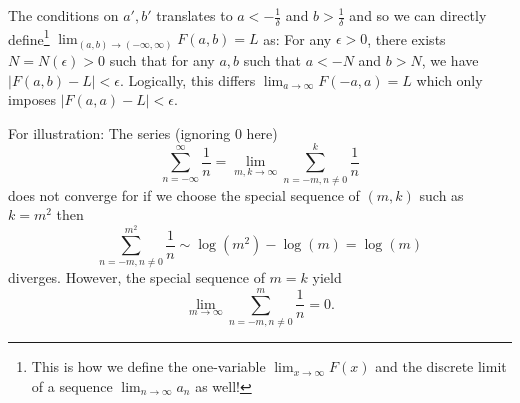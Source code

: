 \documentclass[12pt]{article}
\begin{document}
The conditions on $a', b'$ translates to $a < -\frac{1}{\delta}$ and $b > \frac{1}{\delta}$ and so we can directly define\footnote{This is how we define the one-variable $\lim_{x \rightarrow \infty} F(x)$ and the discrete limit of a sequence $\lim_{n \rightarrow \infty} a_n$ as well!} $\lim_{(a, b) \rightarrow (-\infty, \infty)} F(a, b) = L$ as: For any $\epsilon > 0$, there exists $N = N(\epsilon) > 0$ such that for any $a, b$ such that $a < -N$ and $b > N$, we have $|F(a, b) - L| < \epsilon$. Logically, this differs $\lim_{a \rightarrow \infty} F(-a, a) = L$ which only imposes $|F(a, a) - L| < \epsilon$.

For illustration: The series (ignoring $0$ here)
$$\sum_{n = -\infty}^{\infty} \frac{1}{n} = \lim_{m, k \rightarrow \infty} \sum_{n = -m, n \not= 0}^{k} \frac{1}{n}$$
does not converge for if we choose the special sequence of $(m, k)$ such as $k = m^2$ then
$$\sum_{n = -m, n \not= 0}^{m^2} \frac{1}{n} \sim \log(m^2) - \log(m) = \log(m)$$
diverges. However, the special sequence of $m = k$ yield
$$\lim_{m \rightarrow \infty} \sum_{n = -m, n \not= 0}^{m} \frac{1}{n} = 0.$$

\unless\ifdefined\IsMainDocument
\end{document}
